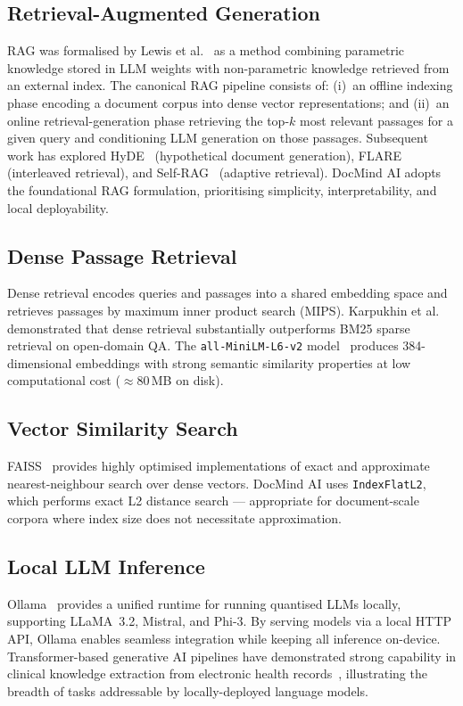 \documentclass[conference]{IEEEtran}
\begin{document}
\subsection{Retrieval-Augmented Generation}
RAG was formalised by Lewis et al.~\cite{lewis2020rag} as a method
combining parametric knowledge stored in LLM weights with non-parametric
knowledge retrieved from an external index.
The canonical RAG pipeline consists of: (i)~an offline indexing phase
encoding a document corpus into dense vector representations; and
(ii)~an online retrieval-generation phase retrieving the top-$k$ most
relevant passages for a given query and conditioning LLM generation on
those passages.
Subsequent work has explored HyDE~\cite{gao2022hyde} (hypothetical
document generation), FLARE~\cite{jiang2023flare} (interleaved
retrieval), and Self-RAG~\cite{asai2023selfrag} (adaptive retrieval).
DocMind AI adopts the foundational RAG formulation, prioritising
simplicity, interpretability, and local deployability.

\subsection{Dense Passage Retrieval}
Dense retrieval encodes queries and passages into a shared embedding
space and retrieves passages by maximum inner product search (MIPS).
Karpukhin et al.~\cite{karpukhin2020dpr} demonstrated that dense
retrieval substantially outperforms BM25 sparse retrieval on open-domain
QA.
The \texttt{all-MiniLM-L6-v2} model~\cite{reimers2019sbert} produces
384-dimensional embeddings with strong semantic similarity properties at
low computational cost (${\approx}80$\,MB on disk).

\subsection{Vector Similarity Search}
FAISS~\cite{johnson2019faiss} provides highly optimised implementations
of exact and approximate nearest-neighbour search over dense vectors.
DocMind AI uses \texttt{IndexFlatL2}, which performs exact L2 distance
search --- appropriate for document-scale corpora where index size does
not necessitate approximation.

\subsection{Local LLM Inference}
Ollama~\cite{ollama2023} provides a unified runtime for running
quantised LLMs locally, supporting LLaMA~3.2, Mistral, and Phi-3.
By serving models via a local HTTP API, Ollama enables seamless
integration while keeping all inference on-device.
Transformer-based generative AI pipelines have demonstrated strong
capability in clinical knowledge extraction from electronic health
records~\cite{naik2025healing}, illustrating the breadth of tasks
addressable by locally-deployed language models.
\end{document}

